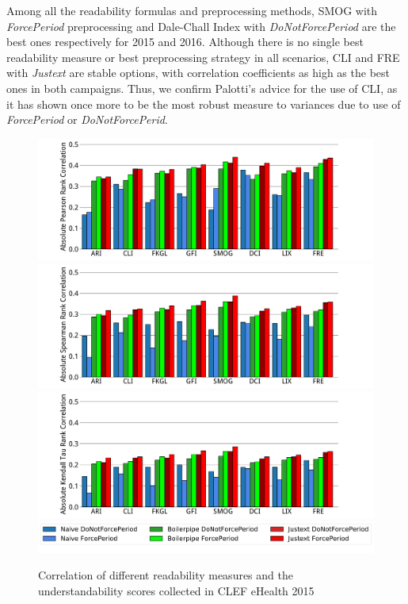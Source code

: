Among all the readability formulas and preprocessing methods, SMOG with \textit{ForcePeriod} preprocessing and Dale-Chall Index with \textit{DoNotForcePeriod} are the best ones respectively for 2015 and 2016. Although there is no single best readability measure or best preprocessing strategy in all scenarios, CLI and FRE with \textit{Justext} are stable options, with correlation coefficients as high as the best ones in both campaigns. Thus, we confirm Palotti's advice for the use of CLI, as it
has shown once more to be the most robust measure to variances due to use of \textit{ForcePeriod} or \textit{DoNotForcePerid}.


\begin{figure}[th!]
   \centering
   \includegraphics[width=1.\textwidth]{graphics/bar_corr_pearson15_values}
   \includegraphics[width=1.00\textwidth]{graphics/bar_corr_spearman15_values}
   \includegraphics[width=1.00\textwidth]{graphics/bar_corr_kendalltau15_values}
   \includegraphics[width=1\textwidth]{graphics/legend62}
    \caption{Correlation of different readability measures and the understandability scores collected in CLEF eHealth 2015}
   \label{fig:bar_corr_clef15}
\end{figure}

